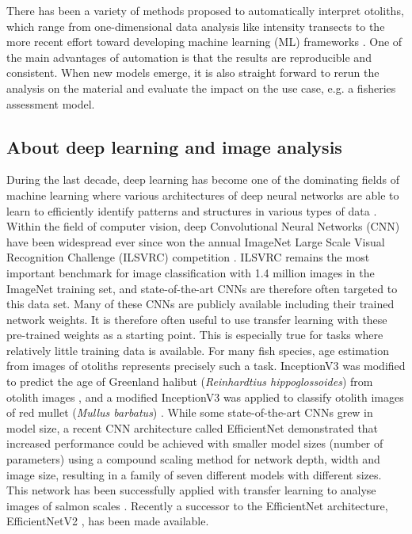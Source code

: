 \documentclass[10pt,letterpaper]{article}
\begin{document}
There has been a variety of methods proposed to automatically interpret otoliths, which range from one-dimensional data analysis like intensity transects \citep{Mahe} to the more recent effort toward developing machine learning (ML) frameworks \citep{moenetal, Politikos, sigurdhardottir2023otolith}. One of the main advantages of automation is that the results are reproducible and consistent. When new models emerge, it is also straight forward to rerun the analysis on the material and evaluate the impact on the use case, e.g. a fisheries assessment model.

\subsection{About deep learning and image analysis}

During the last decade, deep learning has become one of the dominating fields of machine learning where various architectures of deep neural networks are able to learn to efficiently identify patterns and structures in various types of data \citep{lecun2015deep}. Within the field of computer vision, deep Convolutional Neural Networks (CNN) have been widespread ever since 
\citet{krizhevsky_imagenet_2012}
won the annual ImageNet Large Scale Visual Recognition Challenge (ILSVRC) competition  \citep{Russakovsky2015}. ILSVRC remains the most important benchmark for image classification with 1.4 million images in the ImageNet training set, and state-of-the-art CNNs are therefore often targeted to this data set. Many of these CNNs are publicly available including their trained network weights. It is therefore often useful to use transfer learning with these pre-trained weights as a starting point.  This is especially true for tasks where relatively little training data is available. For many fish species, age estimation from images of otoliths represents precisely such a task. InceptionV3 \citep{Szegedy2015} was modified to predict the age of Greenland halibut (\textit{Reinhardtius hippoglossoides}) from otolith images \citep{moenetal}, and a modified InceptionV3 was applied to classify otolith images of red mullet (\textit{Mullus barbatus}) \citep{Politikos}. While some state-of-the-art CNNs grew in model size, a recent CNN architecture called EfficientNet \citep{DBLP:journals/corr/abs-1905-11946} demonstrated that increased performance could be achieved with smaller model sizes (number of parameters) using a compound scaling method for network depth, width and image size, resulting in a family of seven different models with different sizes. This network has been successfully applied with transfer learning to analyse images of salmon scales \citep{vaboeetal}. Recently a successor to the EfficientNet architecture, EfficientNetV2 \citep{EfficientNetV2}, has been made available.
\end{document}
